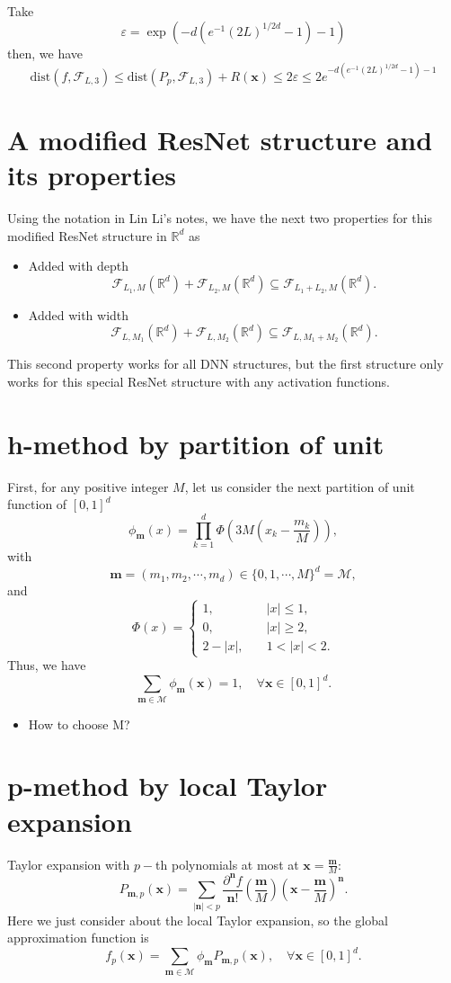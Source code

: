 Take 
\[
\varepsilon = \exp\left(-d\left(e^{-1}(2L)^{1/2d}-1\right)-1\right)
\]
then, we have 
\[
\mbox{dist}(f,\mathcal{F}_{L,3})\le\mbox{dist}(P_{p},\mathcal{F}_{L,3})+ R(\bm x) \le 2\varepsilon \le 2e^{-d\left(e^{-1}(2L)^{1/2d}-1\right)-1}
\]



\section{A modified ResNet structure and its properties}
Using the notation in Lin Li's notes, we have the next two properties for this modified ResNet structure in $\mathbb{R}^d$ as
\begin{itemize}
	\item Added with depth
	$$
	\mathcal F_{L_1,M}(\mathbb{R}^d) + \mathcal{F}_{L_2,M}(\mathbb{R}^d)  \subseteq \mathcal{F}_{L_1+L_2,M}(\mathbb{R}^d) .
	$$
	\item Added with width 
	$$
	\mathcal F_{L,M_1}(\mathbb{R}^d)  + \mathcal{F}_{L,M_2}(\mathbb{R}^d)  \subseteq \mathcal{F}_{L,M_1 + M_2}(\mathbb{R}^d) .
	$$
\end{itemize}
This second property works for all DNN structures, but the first structure only works for this special ResNet structure with any activation functions.

\section{h-method by partition of unit}
First, for any positive integer $M$, let us consider the next partition of unit function of $[0, 1]^d$
$$
\phi_{\bm m}(x) = \prod_{k=1}^d \Phi\left(3M(x_k - \frac{m_k}{M})\right),
$$
with 
$$
{\bm m} = (m_1, m_2, \cdots, m_d) \in \{0,1, \cdots,M\}^d = \mathcal{M},
$$
and 
$$
\Phi(x) = \begin{cases}
1, \quad  &|x| \le 1, \\
0, \quad &|x| \ge 2, \\
2 - |x|, \quad &1 < |x| <2.
\end{cases}
$$
Thus, we have
$$
\sum_{{\bm m} \in \mathcal{M}} \phi_{\bm m}({\bm x}) = 1, \quad \forall {\bm x} \in [0,1]^d.
$$

\begin{itemize}
	\item How to choose M?
\end{itemize}
\section{p-method by local Taylor expansion}
Taylor expansion with $p-$th polynomials at most at ${\bm x} = \frac{{\bm m}}{M}$:
$$
P_{{\bm m}, p}({\bm x}) = \sum_{|{\bm n}| < p}\frac{\partial^{\bm n}f}{ \bm n !}\left(\frac{{\bm m}}{M}\right) ({\bm x} - \frac{{\bm m}}{M})^{\bm n}.
$$
Here we just consider about the local Taylor expansion, so the global approximation function is
$$
f_p({\bm x}) = \sum_{{\bm m} \in \mathcal{M}} \phi_{\bm m} P_{{\bm m}, p}({\bm x}), \quad \forall {\bm x} \in [0,1]^d.
$$

